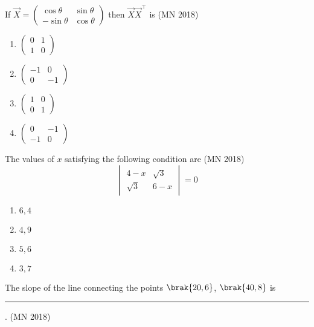 \item 
If 
$\vec{X} = \begin{pmatrix}
\cos\theta & \sin\theta \\
-\sin\theta & \cos\theta
\end{pmatrix}
$
 then  $\vec{X}\vec{X}^{\top}$  is
\hfill(MN 2018)
\begin{multicols}{4}
\begin{enumerate}
\item $ \begin{pmatrix} 0 & 1 \\ 1 & 0 \end{pmatrix}$
\item $\begin{pmatrix} -1 & 0 \\ 0 & -1 \end{pmatrix}$
\item $\begin{pmatrix} 1 & 0 \\ 0 & 1 \end{pmatrix}$
\item $\begin{pmatrix} 0 & -1 \\ -1 & 0 \end{pmatrix}$
\end{enumerate}
\end{multicols}
\item The values of  $x$  satisfying the following condition are
	\hfill(MN 2018)
\[
\begin{vmatrix}
4-x & \sqrt{3} \\
\sqrt{3} & 6-x
\end{vmatrix} = 0
\]
\begin{multicols}{4}
\begin{enumerate}
\item $6,4$ 
\item $4,9$
\item $5,6$
\item $3,7$
\end{enumerate}
\end{multicols}
\item The slope of the line connecting the points $\brak{20,6}$, $\brak{40,8}$ is \rule{1cm}{0.01pt}.
	\hfill(MN 2018)

